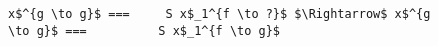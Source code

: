 \begin{figure}[!t]
  \centering
  \begin{minipage}{\columnwidth}
    \begin{lstlisting}[frame=tb]
  x$^{g \to g}$ ===     S x$_1^{f \to ?}$ $\Rightarrow$ x$^{g \to g}$ ===          S x$_1^{f \to g}$
    \end{lstlisting}
  \end{minipage}
\end{figure}